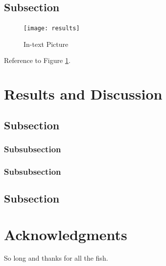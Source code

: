 \documentclass[fleqn,10pt]{wlpeerj} %
\begin{document}
\subsection*{Subsection}

\lipsum[9] %

\begin{figure}[ht]\centering
\texttt{[image: results]}
\caption{In-text Picture}
\label{fig:results}
\end{figure}

Reference to Figure \ref{fig:results}.

\section*{Results and Discussion}

\lipsum[10] %

\subsection*{Subsection}

\lipsum[11] %

\subsubsection*{Subsubsection}

\lipsum[12] %

\subsubsection*{Subsubsection}

\lipsum[14] %

\subsection*{Subsection}

\lipsum[15-20] %

\section*{Acknowledgments}

So long and thanks for all the fish.


\fi
\end{document}
